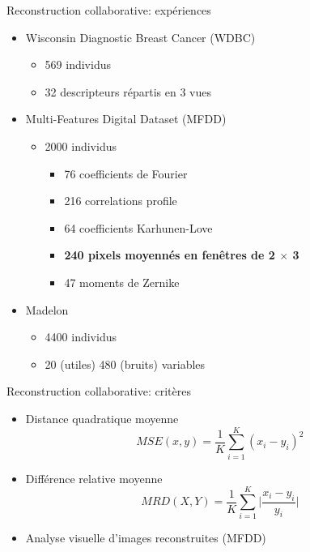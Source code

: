 \documentclass[hyperref={pdfpagelabels=false}]{beamer}
\begin{document}
    \begin{frame}{Reconstruction collaborative: expériences}
        \begin{itemize}
            \item Wisconsin Diagnostic Breast Cancer (WDBC)
                \begin{itemize}
                    \item 569 individus
                    \item 32 descripteurs répartis en 3 vues
                \end{itemize}
            \item Multi-Features Digital Dataset (MFDD)
                \begin{itemize}
                    \item 2000 individus
                    \begin{itemize}
                        \item 76 coefficients de Fourier
                        \item 216 correlations profile
                        \item 64 coefficients Karhunen-Love
                        \item\textbf{240 pixels moyennés en fenêtres de 2 
                            $\times$ 3}
                        \item 47 moments de Zernike
                    \end{itemize}
                \end{itemize}
            \item Madelon
                \begin{itemize}
                    \item 4400 individus
                    \item 20 (utiles) 480 (bruits) variables
                \end{itemize}
        \end{itemize}
    \end{frame}

    \begin{frame}{Reconstruction collaborative: critères}
        \begin{itemize}
            \item Distance quadratique moyenne
                \begin{equation*}
                    MSE(x, y) = \frac{1}{K}\sum_{i = 1}^{K}(x_i - y_i)^2
                \end{equation*}
            \item Différence relative moyenne
                \begin{equation*}
                    MRD(X, Y) = \frac{1}{K}\sum_{i=1}^{K}\Big|\frac{x_i - y_i}{y_i}\Big|
                \end{equation*}
            \item Analyse visuelle d'images reconstruites (MFDD)
        \end{itemize}
    \end{frame}
\end{document}
